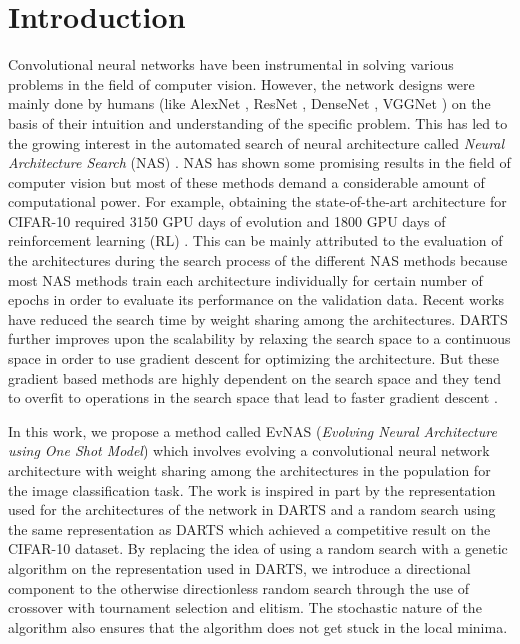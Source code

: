 \documentclass[final]{cvpr}
\begin{document}
\section{Introduction}
Convolutional neural networks have been instrumental in solving various 
problems in the field of computer vision. However, the network designs were mainly done by humans
(like AlexNet \cite{krizhevsky2012imagenet}, ResNet \cite{he2016deep}, DenseNet
\cite{huang2017densely}, VGGNet \cite{simonyan2014very}) on the basis of their intuition and
understanding of the specific problem. This has led to the growing interest in the automated
search of neural architecture called \textit{Neural Architecture Search} (NAS)
\cite{elsken2018neural}\cite{zoph2016neural}\cite{pmlr-v80-pham18a}. NAS has shown some promising
results in the field of computer vision but most of these methods demand a considerable amount of
computational power. For example, obtaining the  state-of-the-art architecture for CIFAR-10
required 3150 GPU days  of evolution \cite{real2019regularized} and 1800 GPU days of reinforcement
learning (RL)  \cite{zoph2018learning}. This can be mainly attributed to the evaluation of the
architectures during the search process of the different NAS methods because most NAS methods
train each architecture individually for certain number of epochs in order to evaluate its
performance on the validation data. Recent works
\cite{pmlr-v80-pham18a}\cite{bender2019understanding} have reduced the search time by weight
sharing among the architectures. DARTS \cite{liu2018darts2} further improves upon the scalability
by relaxing the search space to a continuous space in order to use gradient descent for optimizing
the architecture. But these gradient based methods are highly dependent on the search space and
they tend to overfit to operations in the search space that lead to faster gradient
descent \cite{Zela2020Understanding}.

In this work, we propose a method called EvNAS (\textit{Evolving Neural 
Architecture using One Shot Model}) which involves evolving a convolutional neural
network architecture with weight sharing among the architectures in the population for the
image classification task. The work is inspired in part by the representation used for
the architectures of the network in DARTS \cite{liu2018darts2} and a random
search \cite{li2019random} using the same representation as DARTS which
achieved a competitive result on the CIFAR-10 dataset. By replacing the idea of using
a random search with a genetic algorithm on the representation used in DARTS, we
introduce a directional component to the otherwise directionless random search
\cite{li2019random} through the use of crossover with tournament selection and elitism. The
stochastic nature of the algorithm also ensures that the algorithm does not get stuck in the
local minima.
\end{document}
